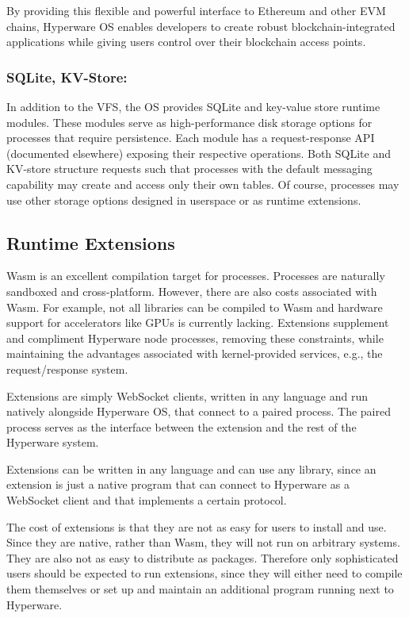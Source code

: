 \documentclass[runningheads]{llncs}
\begin{document}
By providing this flexible and powerful interface to Ethereum and other EVM chains, Hyperware OS enables developers to create robust blockchain-integrated applications while giving users control over their blockchain access points.

\subsubsection{SQLite, KV-Store:}
\label{sec:osdbs}

In addition to the VFS, the OS provides SQLite and key-value store runtime modules.
These modules serve as high-performance disk storage options for processes that require persistence.
Each module has a request-response API (documented elsewhere) exposing their respective operations.
Both SQLite and KV-store structure requests such that processes with the default messaging capability may create and access only their own tables.
Of course, processes may use other storage options designed in userspace or as runtime extensions.

\subsection{Runtime Extensions}
\label{sec:osextensions}

Wasm is an excellent compilation target for processes.
Processes are naturally sandboxed and cross-platform.
However, there are also costs associated with Wasm.
For example, not all libraries can be compiled to Wasm and hardware support for accelerators like GPUs is currently lacking.
Extensions supplement and compliment Hyperware node processes, removing these constraints, while maintaining the advantages associated with kernel-provided services, e.g., the request/response system.

Extensions are simply WebSocket clients, written in any language and run natively alongside Hyperware OS, that connect to a paired process.
The paired process serves as the interface between the extension and the rest of the Hyperware system.

Extensions can be written in any language and can use any library, since an extension is just a native program that can connect to Hyperware as a WebSocket client and that implements a certain protocol.

The cost of extensions is that they are not as easy for users to install and use.
Since they are native, rather than Wasm, they will not run on arbitrary systems.
They are also not as easy to distribute as packages.
Therefore only sophisticated users should be expected to run extensions, since they will either need to compile them themselves or set up and maintain an additional program running next to Hyperware.
\end{document}

